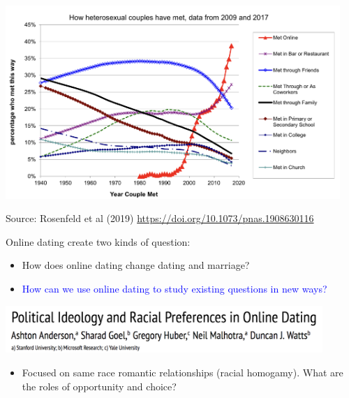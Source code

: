 \documentclass[aspectratio=169]{beamer}
\begin{document}
\begin{frame}

\begin{center}
\includegraphics[width=0.95\textwidth]{figures/rosenfeld_disintermediating_2019_fig1}
\end{center}

\vfill
Source: Rosenfeld et al (2019) \url{https://doi.org/10.1073/pnas.1908630116}

\end{frame}
\begin{frame}

Online dating create two kinds of question:
\begin{itemize}
\item How does online dating change dating and marriage?
\item \textcolor{blue}{How can we use online dating to study existing questions in new ways?}
\end{itemize}

\end{frame}
\begin{frame}

\begin{center}
\includegraphics[width=0.9\textwidth]{figures/anderson_political_2014_title}
\end{center}

\vfill
\begin{itemize}
\item Focused on same race romantic relationships (racial homogamy). What are the roles of opportunity and choice?
\end{itemize}

\end{frame}
\end{document}
